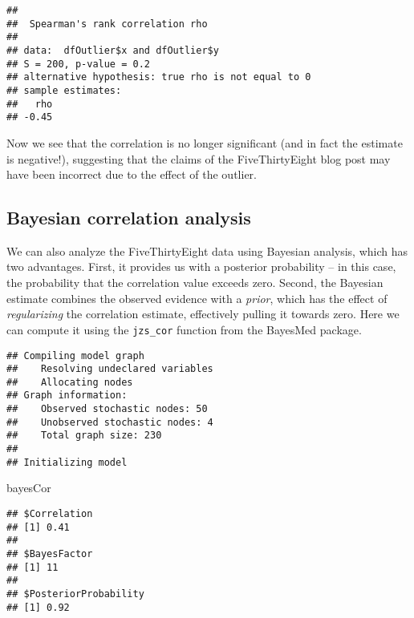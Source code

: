 \documentclass[]{book}
\newenvironment{Shaded}{\begin{snugshade}}{\end{snugshade}}
\newcommand{\KeywordTok}[1]{\textcolor[rgb]{0.13,0.29,0.53}{\textbf{#1}}}
\newcommand{\StringTok}[1]{\textcolor[rgb]{0.31,0.60,0.02}{#1}}
\newcommand{\OperatorTok}[1]{\textcolor[rgb]{0.81,0.36,0.00}{\textbf{#1}}}
\newcommand{\NormalTok}[1]{#1}
\theoremstyle{definition}
\theoremstyle{definition}
\theoremstyle{definition}
\theoremstyle{remark}
\begin{document}
\begin{verbatim}
## 
##  Spearman's rank correlation rho
## 
## data:  dfOutlier$x and dfOutlier$y
## S = 200, p-value = 0.2
## alternative hypothesis: true rho is not equal to 0
## sample estimates:
##   rho 
## -0.45
\end{verbatim}

Now we see that the correlation is no longer significant (and in fact
the estimate is negative!), suggesting that the claims of the
FiveThirtyEight blog post may have been incorrect due to the effect of
the outlier.

\subsection{Bayesian correlation
analysis}\label{bayesian-correlation-analysis}

We can also analyze the FiveThirtyEight data using Bayesian analysis,
which has two advantages. First, it provides us with a posterior
probability -- in this case, the probability that the correlation value
exceeds zero. Second, the Bayesian estimate combines the observed
evidence with a \emph{prior}, which has the effect of
\emph{regularizing} the correlation estimate, effectively pulling it
towards zero. Here we can compute it using the \texttt{jzs\_cor}
function from the BayesMed package.

\begin{Shaded}
\end{Shaded}

\begin{verbatim}
## Compiling model graph
##    Resolving undeclared variables
##    Allocating nodes
## Graph information:
##    Observed stochastic nodes: 50
##    Unobserved stochastic nodes: 4
##    Total graph size: 230
## 
## Initializing model
\end{verbatim}

\begin{Shaded}
\begin{Highlighting}[]
\NormalTok{bayesCor}
\end{Highlighting}
\end{Shaded}

\begin{verbatim}
## $Correlation
## [1] 0.41
## 
## $BayesFactor
## [1] 11
## 
## $PosteriorProbability
## [1] 0.92
\end{verbatim}
\end{document}
